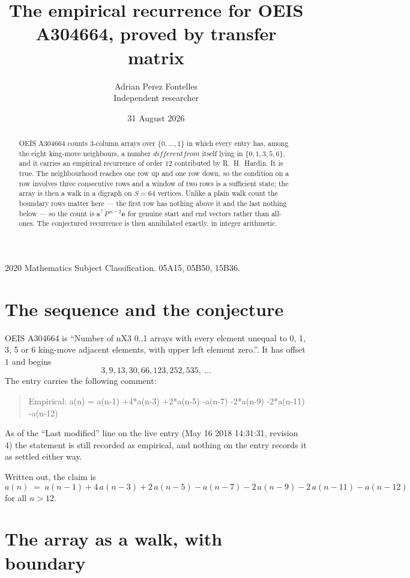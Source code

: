 \documentclass[11pt,a4paper]{article}
\title{The empirical recurrence for OEIS A304664, proved by transfer matrix}
\author{Adrian Perez Fontelles\\ \small Independent researcher}
\date{31 August 2026}
\theoremstyle{plain}
\theoremstyle{definition}
\begin{document}
\maketitle

\begin{abstract}
OEIS A304664 counts $3$-column arrays over $\{0,\dots,1\}$ in which every entry has,
among the eight king-move neighbours, a number $different from$ itself lying in $\{0,1,3,5,6\}$, and it carries an empirical
recurrence of order $12$ contributed by R.~H.~Hardin. It is true. The neighbourhood
reaches one row up and one row down, so the condition on a row involves three consecutive
rows and a window of two rows is a sufficient state; the array is then a walk in a digraph
on $S=64$ vertices. Unlike a plain walk count the boundary rows matter here --- the first
row has nothing above it and the last nothing below --- so the count is
$\mathbf{s}^{\!\top}P^{\,n-2}\mathbf{e}$ for genuine start and end vectors rather than
all-ones. The conjectured recurrence is then annihilated exactly, in integer arithmetic.
\end{abstract}

\noindent\small 2020 Mathematics Subject Classification. 05A15, 05B50, 15B36.\normalsize

\section{The sequence and the conjecture}

OEIS A304664 is ``Number of nX3 0..1 arrays with every element unequal to 0, 1, 3, 5 or 6 king-move adjacent elements, with upper left element zero.''. It has offset
$1$ and begins
\[
3, 9, 13, 30, 66, 123, 252, 535,\ \dots
\]
The entry carries the following comment:
\begin{quote}\small
Empirical: a(n) = a(n-1) +4*a(n-3) +2*a(n-5) -a(n-7) -2*a(n-9) -2*a(n-11) -a(n-12)
\end{quote}
As of the ``Last modified'' line on the live entry (May 16 2018 14:31:31, revision
4) the statement is still recorded as empirical, and nothing on the entry
records it as settled either way.

Written out, the claim is
\begin{equation}\label{eq:conj}
a(n)\;=\;a(n-1) + 4\,a(n-3) + 2\,a(n-5) - a(n-7) - 2\,a(n-9) - 2\,a(n-11) - a(n-12)
\end{equation}
for all $n>12$.

\section{The array as a walk, with boundary}
\end{document}
